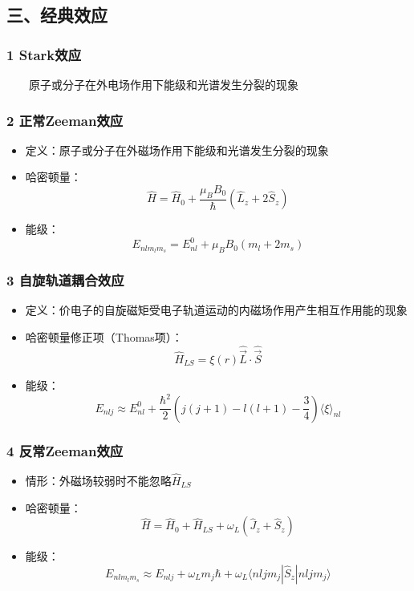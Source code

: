 \documentclass[UTF8,twocolumn]{ctexart}
\providecommand{\tightlist}{%
  \setlength{\itemsep}{0pt}\setlength{\parskip}{0pt}}
\begin{document}
\subsection{三、经典效应}\label{ux4e09ux7ecfux5178ux6548ux5e94}

\subsubsection{1 Stark效应}\label{starkux6548ux5e94}

  原子或分子在外电场作用下能级和光谱发生分裂的现象

\subsubsection{2 正常Zeeman效应}\label{ux6b63ux5e38zeemanux6548ux5e94}

\begin{itemize}
\tightlist
\item
  定义：原子或分子在外磁场作用下能级和光谱发生分裂的现象
\item
  哈密顿量：
  \[\hat{H}=\hat{H}_0+\frac{\mu_BB_0}{\hbar}(\hat{L}_z+2\hat{S}_z)\]
\item
  能级： \[E_{nlm_lm_s}=E_{nl}^0+\mu_BB_0(m_l+2m_s)\]
\end{itemize}

\subsubsection{3
自旋轨道耦合效应}\label{ux81eaux65cbux8f68ux9053ux8026ux5408ux6548ux5e94}

\begin{itemize}
\tightlist
\item
  定义：价电子的自旋磁矩受电子轨道运动的内磁场作用产生相互作用能的现象
\item
  哈密顿量修正项（Thomas项）：
  \[\hat{H}_{LS}=\xi(r)\hat{\vec{L}}\cdot\hat{\vec{S}}\]
\item
  能级：
  \[E_{nlj}\approx E_{nl}^0+\frac{\hbar^2}{2}(j(j+1)-l(l+1)-\frac{3}{4})\langle\xi\rangle_{nl}\]
\end{itemize}

\subsubsection{4 反常Zeeman效应}\label{ux53cdux5e38zeemanux6548ux5e94}

\begin{itemize}
\tightlist
\item
  情形：外磁场较弱时不能忽略\(\hat{H}_{LS}\)
\item
  哈密顿量：
  \[\hat{H}=\hat{H}_0+\hat{H}_{LS}+\omega_L(\hat{J}_z+\hat{S}_z)\]
\item
  能级：
  \[E_{nlm_lm_s}\approx E_{nlj}+\omega_Lm_j\hbar+\omega_L\langle nljm_j|\hat{S}_z|nljm_j\rangle\]
\end{itemize}
\end{document}
